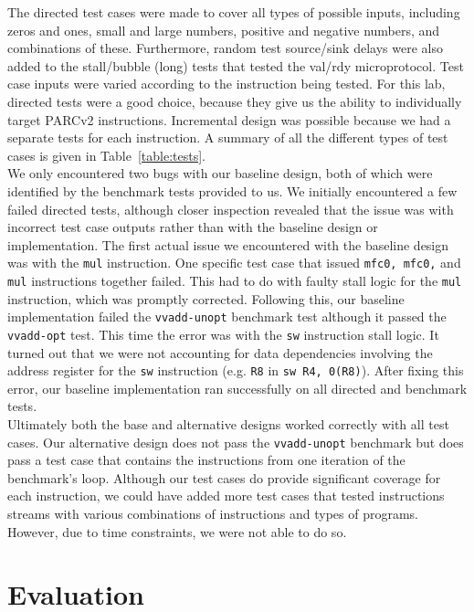 \documentclass[10pt]{article}
\begin{document}
The directed test cases were made to cover all types of possible inputs, including zeros and ones, small and large numbers, positive and negative numbers, and combinations of these. Furthermore, random test source/sink delays were also added to the stall/bubble (long) tests that tested the val/rdy microprotocol. Test case inputs were varied according to the instruction being tested. For this lab, directed tests were a good choice, because they give us the ability to individually target PARCv2 instructions. Incremental design was possible because we had a separate tests for each instruction. A summary of all the different types of test cases is given in Table~\ref{table:tests}. \\

We only encountered two bugs with our baseline design, both of which were identified by the benchmark tests provided to us. We initially encountered a few failed directed tests, although closer inspection revealed that the issue was with incorrect test case outputs rather than with the baseline design or implementation. The first actual issue we encountered with the baseline design was with the \texttt{mul} instruction. One specific test case that issued \texttt{mfc0, mfc0,} and \texttt{mul} instructions together failed. This had to do with faulty stall logic for the \texttt{mul} instruction, which was promptly corrected. Following this, our baseline implementation failed the \texttt{vvadd-unopt} benchmark test although it passed the \texttt{vvadd-opt} test. This time the error was with the \texttt{sw} instruction stall logic. It turned out that we were not accounting for data dependencies involving the address register for the \texttt{sw} instruction (e.g. \texttt{R8} in \texttt{sw R4, 0(R8)}). After fixing this error, our baseline implementation ran successfully on all directed and benchmark tests. \\ 

Ultimately both the base and alternative designs worked correctly with all test cases. Our alternative design does not pass the \texttt{vvadd-unopt} benchmark but does pass a test case that contains the instructions from one iteration of the benchmark's loop. Although our test cases do provide significant coverage for each instruction, we could have added more test cases that tested instructions streams with various combinations of instructions and types of programs. However, due to time constraints, we were not able to do so. \\


\section{Evaluation}
\end{document}
